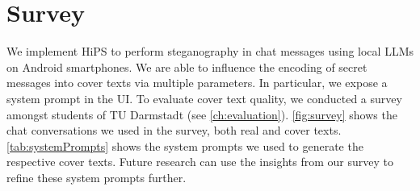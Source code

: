 
\chapter{Survey}\label{ch:survey}
\glsresetall %

We implement \gls{HiPS} to perform steganography in chat messages using local \glspl{LLM} on Android smartphones. We are able to influence the encoding of secret messages into cover texts via multiple parameters. In particular, we expose a system prompt in the \gls{UI}. To evaluate cover text quality, we conducted a survey amongst students of TU Darmstadt (see \cref{ch:evaluation}). \cref{fig:survey} shows the chat conversations we used in the survey, both real and cover texts. \cref{tab:systemPrompts} shows the system prompts we used to generate the respective cover texts. Future research can use the insights from our survey to refine these system prompts further.

